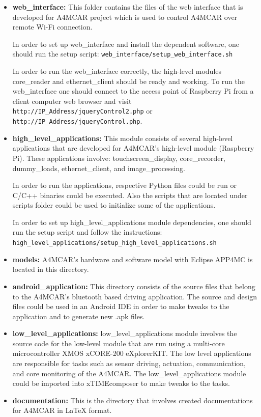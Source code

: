 \begin{itemize}
	\item \textbf{web{\_}interface: } This folder contains the files of the web interface that is developed for A4MCAR project which is used to control A4MCAR over remote Wi-Fi connection. 
	
	In order to set up web{\_}interface and install the dependent software, one should run the setup script: \texttt{web{\_}interface/setup{\_}web{\_}interface.sh}
	
	In order to run the web{\_}interface correctly, the high-level modules core{\_}reader
	and ethernet{\_}client should be ready and working.
	To run the web{\_}interface one should connect to the access point of Raspberry Pi
	from a client computer web browser and visit 
	\texttt{http://IP{\_}Address/jqueryControl2.php} or \texttt{http://IP{\_}Address/jqueryControl.php}.
	
	\item \textbf{high{\_}level{\_}applications: } This module consists of several high-level applications that are developed for A4MCAR's high-level module (Raspberry Pi). These applications involve: 
	touchscreen{\_}display, core{\_}recorder, dummy{\_}loads, ethernet{\_}client, and 
	image{\_}processing.
	
	In order to run the applications, respective Python files could be run or C/C++
	binaries could be executed. Also the scripts that are located under scripts folder could be used to initialize some of the applications.
	
	In order to set up high{\_}level{\_}applications module dependencies, one should run
	the setup script and follow the instructions:
	\texttt{high{\_}level{\_}applications/setup{\_}high{\_}level{\_}applications.sh}
	\item \textbf{models: } A4MCAR's hardware and software model with Eclipse APP4MC is located in this 
	directory.
	\item \textbf{android{\_}application: } This directory consists of the source files that belong to the A4MCAR's bluetooth
	based driving application. The source and design files could be used in an Android IDE in order to make tweaks to the application and to generate new .apk files.
	\item \textbf{low{\_}level{\_}applications: } low{\_}level{\_}applications module involves the source code for the low-level module that
	are run using a multi-core microcontroller XMOS xCORE-200 eXplorerKIT. The low level
	applications are responsible for tasks such as sensor driving, actuation, communication,
	and core monitoring of the A4MCAR. The low{\_}level{\_}applications module could be imported into xTIMEcomposer to make tweaks to the tasks.
	\item \textbf{documentation: } This is the directory that involves created documentations for A4MCAR in LaTeX format.
\end{itemize}
